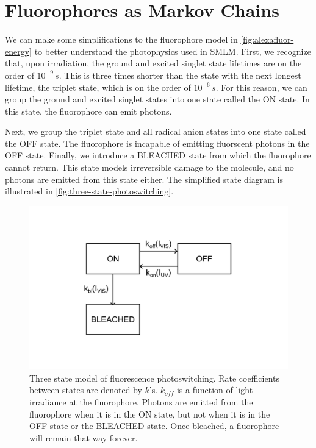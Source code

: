 \documentclass[10pt,a4paper,oneside]{book}
\begin{document}
\section{Fluorophores as Markov Chains}

We can make some simplifications to the fluorophore model in \autoref{fig:alexafluor-energy} to better understand the photophysics used in SMLM. First, we recognize that, upon irradiation, the ground and excited singlet state lifetimes are on the order of $10^{-9} \, s$. This is three times shorter than the state with the next longest lifetime, the triplet state, which is on the order of $10^{-6} \, s$. For this reason, we can group the ground and excited singlet states into one state called the ON state. In this state, the fluorophore can emit photons.

Next, we group the triplet state and all radical anion states into one state called the OFF state. The fluorophore is incapable of emitting fluorscent photons in the OFF state. Finally, we introduce a BLEACHED state from which the fluorophore cannot return. This state models irreversible damage to the molecule, and no photons are emitted from this state either. The simplified state diagram is illustrated in \autoref{fig:three-state-photoswitching}.

\begin{figure}[ht]
    \centering
    \includegraphics{three-state-photoswitching-model.png}
    \caption{Three state model of fluorescence photoswitching. Rate coefficients between states are denoted by $k$'s. $k_{off}$ is a function of light irradiance at the fluorophore. Photons are emitted from the fluorophore when it is in the ON state, but not when it is in the OFF state or the BLEACHED state. Once bleached, a fluorophore will remain that way forever.}
    \label{fig:three-state-photoswitching}
\end{figure}
\end{document}

